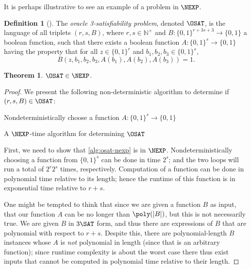 \documentclass[english]{reedthesis}
\theoremstyle{plain}
\newtheorem{thm}{Theorem}[section]
\theoremstyle{definition}
\newtheorem{defn}[defn]{Definition}
\theoremstyle{remark}
\DeclarePairedDelimiter{\abs}{\lvert}{\rvert}
\begin{document}
It is perhaps illustrative to see an example of a problem in $\NEXP$. %

\begin{defn}[{\cite[Def.\ 14.1]{CFGS22}}]\label{def:oracle-3sat}
  The \emph{oracle 3-satisfiability problem}, denoted $\OSAT$, is the language
  of all triplets $(r, s, B)$, where $r, s \in \mathbb{N}^{+}$ and
  $B: \{0, 1\}^{r+3s+3} \rightarrow \{0, 1\}$ a boolean function, such that there exists a
  boolean function $A: \{0, 1\}^{s} \rightarrow \{0, 1\}$ having the property that for all
  $z \in \{0, 1\}^{r}$ and $b_{1}, b_{2}, b_{3} \in \{0, 1\}^{s}$,
  \begin{equation*}
    B(z, b_{1}, b_{2}, b_{3}, A(b_{1}), A(b_{2}), A(b_{3})) = 1.
  \end{equation*}
\end{defn}

\begin{thm}\label{thm:o3sat-in-nexp}
  $\OSAT \in \NEXP$.
\end{thm}

\begin{proof}
  We present the following non-deterministic algorithm to determine if
  $(r, s, B) \in \OSAT$:

  \begin{algorithm}[H]
    Nondeterministically choose a function $A: \{0, 1\}^{s} \rightarrow \{0, 1\}$\;
    \;
    \caption{A $\NEXP$-time algorithm for determining $\OSAT$}\label{alg:osat-nexp}
  \end{algorithm}

  First, we need to show that \cref{alg:osat-nexp} is in $\NEXP$.
  Nondeterministically choosing a function from $\{0, 1\}^{s}$ can be done in
  time $2^{s}$; and the two loops will run a total of $2^{r}2^{s}$ times,
  respectively. Computation of a function can be done in polynomial time
  relative to its length; hence the runtime of this function is in exponential
  time relative to $r + s$.

  One might be tempted to think that since we are given a function $B$ as input,
  that our function $A$ can be no longer than $\poly(\abs{B})$, but this is not
  necessarily true. We are given $B$ in $3\SAT$ form, and thus there are
  expressions of $B$ that are polynomial with respect to $r + s$. Despite this,
  there are polynomial-length $B$ instances whose $A$ is \emph{not} polynomial
  in length (since that is an arbitrary function); since runtime complexity is
  about the worst case there thus exist inputs that cannot be computed in
  polynomial time relative to their length.
\end{proof}
\end{document}
